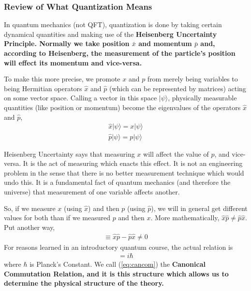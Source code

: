 \documentclass[12pt,epsf]{article}
\def\nolabel{\nonumber }
\def\nolabel{\nonumber }
\begin{document}
\subsubsection{Review of What Quantization Means}
\label{sec:quantreview}

In quantum mechanics (not QFT), quantization is done by taking
certain dynamical quantities and making use of the \bf Heisenberg
Uncertainty Principle\rm.  Normally we take position $\bar x$ and
momentum $\bar p$ and, according to Heisenberg, the measurement of the
particle's position will effect its momentum and vice-versa.  

To make this more precise, we promote $x$ and $p$ from merely being
variables to being Hermitian operators $\hat x$ and $\hat p$ (which can be represented by
matrices)  acting on some vector space.  Calling a
vector in this space $|\psi\rangle$, physically measurable quantities
(like position or momentum) become the eigenvalues of the operators
$\hat x$ and $\hat p$, 
\begin{eqnarray}
\hat x |\psi\rangle = x |\psi \rangle \nolabel \\
\hat p |\psi \rangle = p|\psi \rangle\nolabel
\end{eqnarray}

Heisenberg Uncertainty says that measuring $x$ will affect the value of
$p$, and vice-versa.  It is the act of measuring which enacts this
effect.  It is not an engineering problem in the sense that there is no
better measurement technique which would undo this.  It is a
fundamental fact of quantum mechanics (and therefore the universe) that
measurement of one variable affects another.  

So, if we measure $x$ (using $\hat x$) and then $p$ (using $\hat p$),
we will in general get different values for both than if we measured
$p$ and then $x$.  More mathematically, $\hat x \hat p \neq \hat p \hat
x$.  Put another way, 
\begin{eqnarray}
[\hat x, \hat p] \equiv \hat x \hat p - \hat p \hat x \neq 0 \nolabel
\end{eqnarray}
For reasons learned in an introductory quantum course, the actual
relation is 
\begin{eqnarray}
[\hat x, \hat p] = i\hbar \label{eq:cancom}
\end{eqnarray}
where $\hbar$ is Planck's Constant.  We call (\ref{eq:cancom}) the \bf
Canonical Commutation Relation\rm, and it is this structure which
allows us to determine the physical structure of the theory.  
\end{document}
